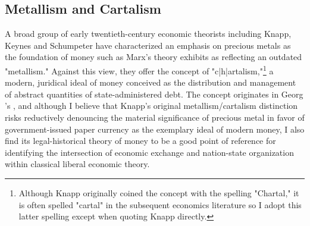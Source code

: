 \subsection*{Metallism and Cartalism}
A broad group of early twentieth-century economic theorists including Knapp, Keynes and Schumpeter have characterized an emphasis on precious metals as the foundation of money such as Marx's theory exhibits as reflecting an outdated "metallism." Against this view, they offer the concept of "c|h|artalism,"\footnote{
  Although Knapp originally coined the concept with the spelling "Chartal," it is often spelled "cartal" in the subsequent economics literature so I adopt this latter spelling except when quoting Knapp directly.
} a modern, juridical ideal of money conceived as the distribution and management of abstract quantities of state-administered debt. The concept originates in Georg \citeauthor{Knapp1924}'s , and although I believe that Knapp's original metallism/cartalism distinction risks reductively denouncing the material significance of precious metal in favor of government-issued paper currency as the exemplary ideal of modern money, I also find its legal-historical theory of money to be a good point of reference for identifying the intersection of economic exchange and nation-state organization within classical liberal economic theory.


